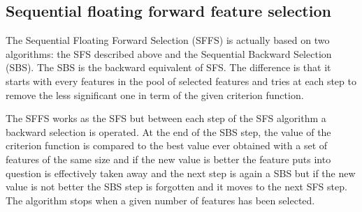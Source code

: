 \documentclass[a4paper,11pt,DIV=16,abstracton]{scrartcl}
\begin{document}
    \begin{table}[!ht]
        \caption{Criterion functions values corresponding to Figure~\ref{fig:expl_dataset} dataset (50\% for training/50\% for testing).\label{tab:expl_metric}}
    \end{table}


    \subsection{Sequential floating forward feature selection}
    \label{sec:floating-presentation}

    The Sequential Floating Forward Selection (SFFS) is actually based on two algorithms: the SFS described above and the Sequential Backward Selection (SBS). The SBS is the backward equivalent of SFS. The difference is that it starts with every features in the pool of selected features and tries at each step to remove the less significant one in term of the given criterion function.

    The SFFS works as the SFS but between each step of the SFS algorithm a backward selection is operated. At the end of the SBS step, the value of the criterion function is compared to the best value ever obtained with a set of features of the same size and if the new value is better the feature puts into question is effectively taken away and the next step is again a SBS but if the new value is not better the SBS step is forgotten and it moves to the next SFS step. The algorithm stops when a given number of features has been selected.
\end{document}
